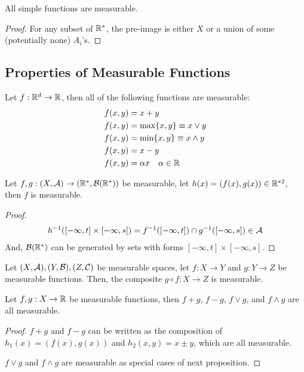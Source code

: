 \documentclass[11pt]{article}
\begin{document}
	\begin{proposition}
		All simple functions are measurable.
		\begin{proof}
			For any subset of $\mathbb{R}^*$, the pre-image is either $X$ or a union of some (potentially none) $A_i$'s.
		\end{proof}
	\end{proposition}
	
	\subsection{Properties of Measurable Functions}
	
	\begin{example}
		Let $f: \mathbb{R}^d \to \mathbb{R}$, then all of the following functions are measurable:
		\begin{align}
			f(x, y) &= x + y \\
			f(x, y) &= \max\{x, y\} \equiv x \lor y \\
			f(x, y) &= \min\{x, y\} \equiv x \land y \\
			f(x, y) &= x - y \\
			f(x, y) &= \alpha x\quad \alpha \in \mathbb{R}
		\end{align}
	\end{example}
	
	\begin{proposition}
		Let $f, g: (X, \mathcal{{A}}) \to (\mathbb{R}^*, \mathcal{{B}}(\mathbb{R}^*))$ be measurable, let $h(x) = (f(x), g(x)) \in \mathbb{R}^{*2}$, then $f$ is measurable.
		\begin{proof}
			\begin{align}
				h^{-1}([-\infty, t] \times [-\infty, s]) = f^{-1}([-\infty, t]) \cap g^{-1}([-\infty, s]) \in \mathcal{{A}}
			\end{align}
			And, $\mathcal{{B}}(\mathbb{R}^*)$ can be generated by sets with forms $[-\infty, t] \times [-\infty, s]$.
		\end{proof}
	\end{proposition}
	
	\begin{proposition}
		Let $(X, \mathcal{{A}}), (Y, \mathcal{{B}}), (Z, \mathcal{{C}})$ be measurable spaces, let $f: X \to Y$ and $g: Y \to Z$ be measurable functions. Then, the composite $g \circ f: X \to Z$ is measurable.
	\end{proposition}
	
	\begin{corollary}
		Let $f, g: X \to \mathbb{R}$ be measurable functions, then $f+g$, $f-g$, $f \lor g$, and $f \land g$ are all measurable.
		\begin{proof}
			$f+g$ and $f-g$ can be written as the composition of $h_1(x) = (f(x), g(x))$ and $h_2(x, y) = x \pm y$, which are all measurable.
			
			$f \lor g$ and $f \land g$ are measurable as special cases of next proposition.
		\end{proof}
	\end{corollary}
	
\end{document}
